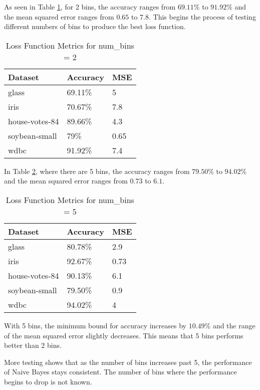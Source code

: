 \documentclass[twoside,11pt]{article}
\begin{document}
As seen in Table \ref{tab:metrics2}, for 2 bins, the accuracy ranges from $69.11\%$ to $91.92\%$ and the mean squared error ranges from $0.65$ to $7.8$. This begins the process of testing different numbers of bins to produce the best loss function.
\begin{table}[h]
	\centering
	\caption{Loss Function Metrics for num\_bins = 2} \label{tab:metrics2}
	\begin{tabular}{|l|l|l|}
		\hline
		Dataset                  & Accuracy & MSE  \\ \hline
		glass                    & 69.11\%  & 5    \\ \hline
		iris                     & 70.67\%  & 7.8  \\ \hline
		house-votes-84           & 89.66\%  & 4.3  \\ \hline
		soybean-small            & 79\%     & 0.65 \\ \hline
		wdbc                     & 91.92\%  & 7.4  \\ \hline
	\end{tabular}
\end{table}

In Table \ref{tab:metrics5}, where there are 5 bins, the accuracy ranges from $79.50\%$ to $94.02\%$ and the mean squared error ranges from $0.73$ to $6.1$.
\begin{table}[h]
	\centering
	\caption{Loss Function Metrics for num\_bins = 5} \label{tab:metrics5}
	\begin{tabular}{|l|l|l|}
		\hline
		Dataset                  & Accuracy & MSE  \\ \hline
		glass                    & 80.78\%  & 2.9  \\ \hline
		iris                     & 92.67\%  & 0.73 \\ \hline
		house-votes-84           & 90.13\%  & 6.1  \\ \hline
		soybean-small            & 79.50\%  & 0.9  \\ \hline
		wdbc                     & 94.02\%  & 4    \\ \hline
	\end{tabular}
\end{table}

With 5 bins, the minimum bound for accuracy increases by $10.49\%$ and the range of the mean squared error slightly decreases.
This means that 5 bins performs better than 2 bins.

More testing shows that as the number of bins increases past 5, the performance of Naive Bayes stays consistent. The number of bins where the performance begins to drop is not known.
\end{document}
